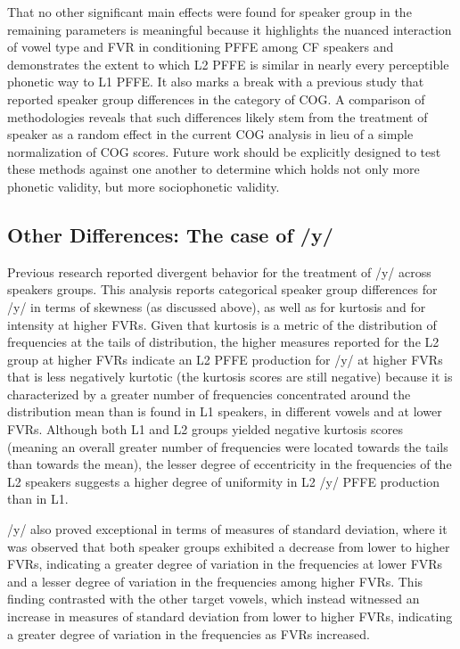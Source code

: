 \documentclass[output=paper,colorlinks,citecolor=brown,draftmode]{langscibook}
\begin{document}
That no other significant main effects were found for speaker group in the remaining parameters is meaningful because it highlights the nuanced interaction of vowel type and FVR in conditioning PFFE among CF speakers and demonstrates the extent to which L2 PFFE is similar in nearly every perceptible phonetic way to L1 PFFE. It also marks a break with a previous study \citep{dalola2020redefining} that reported speaker group differences in the category of COG. A comparison of methodologies reveals that such differences likely stem from the treatment of speaker as a random effect in the current COG analysis in lieu of a simple normalization of COG scores. Future work should be explicitly designed to test these methods against one another to determine which holds not only more phonetic validity, but more sociophonetic validity.

\subsection{Other Differences: The case of /y/}
Previous research \citep{dalola2020redefining} reported divergent behavior for the treatment of /y/ across speakers groups. This analysis reports categorical speaker group differences for /y/ in terms of skewness (as discussed above), as well as for kurtosis and for intensity at higher FVRs. Given that kurtosis is a metric of the distribution of frequencies at the tails of distribution, the higher measures reported for the L2 group at higher FVRs indicate an L2 PFFE production for /y/ at higher FVRs that is less negatively kurtotic (the kurtosis scores are still negative) because it is characterized by a greater number of frequencies concentrated around the distribution mean than is found in L1 speakers, in different vowels and at lower FVRs. Although both L1 and L2 groups yielded negative kurtosis scores (meaning an overall greater number of frequencies were located towards the tails than towards the mean), the lesser degree of eccentricity in the frequencies of the L2 speakers suggests a higher degree of uniformity in L2 /y/ PFFE production than in L1.


/y/ also proved exceptional in terms of measures of standard deviation, where it was observed that both speaker groups exhibited a decrease from lower to higher FVRs, indicating a greater degree of variation in the frequencies at lower FVRs and a lesser degree of variation in the frequencies among higher FVRs. This finding contrasted with the other target vowels, which instead witnessed an increase in measures of standard deviation from lower to higher FVRs, indicating a greater degree of variation in the frequencies as FVRs increased.
\end{document}
